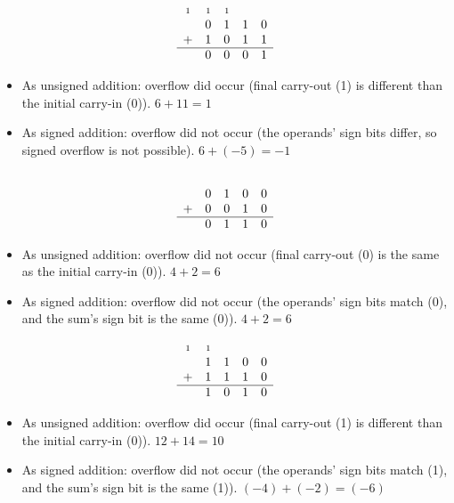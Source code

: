 \documentclass{article}
\newcommand{\carry}{\scriptstyle 1}
\begin{document}
\begin{equation*}\begin{array}{ccccc}
 \carry & \carry & \carry & & \\
  & 0 & 1 & 1 & 0 \\
+ & 1 & 0 & 1 & 1 \\ \hline
  & 0 & 0 & 0 & 1
\end{array}\end{equation*}

\begin{itemize}
\item As unsigned addition: overflow did occur (final carry-out (1) is
    different than the initial carry-in (0)). $6+11=1$
\item As signed addition: overflow did not occur (the operands' sign bits
    differ, so signed overflow is not possible). $6+(-5)=-1$
\end{itemize}

\begin{equation*}\begin{array}{ccccc}
  &   &   &   & \\
  & 0 & 1 & 0 & 0 \\
+ & 0 & 0 & 1 & 0 \\ \hline
  & 0 & 1 & 1 & 0
\end{array}\end{equation*}

\begin{itemize}
\item As unsigned addition: overflow did not occur (final carry-out (0) is the
    same as the initial carry-in (0)). $4+2=6$
\item As signed addition: overflow did not occur (the operands' sign bits
    match (0), and the sum's sign bit is the same (0)). $4+2=6$
\end{itemize}

\begin{equation*}\begin{array}{ccccc}
 \carry & \carry & & & \\
  & 1 & 1 & 0 & 0 \\
+ & 1 & 1 & 1 & 0 \\ \hline
  & 1 & 0 & 1 & 0
\end{array}\end{equation*}

\begin{itemize}
\item As unsigned addition: overflow did occur (final carry-out (1) is
    different than the initial carry-in (0)). $12+14=10$
\item As signed addition: overflow did not occur (the operands' sign bits
    match (1), and the sum's sign bit is the same (1)). $(-4)+(-2)=(-6)$
\end{itemize}
\end{document}
